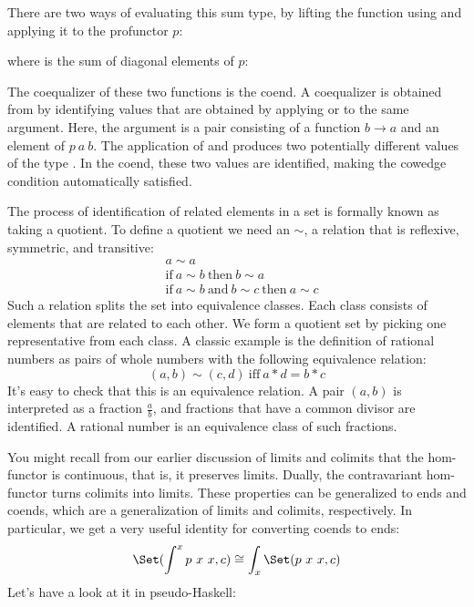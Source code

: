 There are two ways of evaluating this sum type, by lifting the function
using  and applying it to the profunctor $p$:

where  is the sum of diagonal elements of $p$:

The coequalizer of these two functions is the coend. A coequalizer is
obtained from  by identifying values that are
obtained by applying  or  to the same
argument. Here, the argument is a pair consisting of a function
$b \to a$ and an element of $p\ a\ b$. The
application of  and  produces two potentially
different values of the type . In the coend, these
two values are identified, making the cowedge condition automatically
satisfied.

The process of identification of related elements in a set is formally
known as taking a quotient. To define a quotient we need an
 $\sim$, a relation that
is reflexive, symmetric, and transitive:
\begin{align*}
&a \sim a \\
&\text{if}\ a \sim b\ \text{then}\ b \sim a \\
&\text{if}\ a \sim b\ \text{and}\ b \sim c\ \text{then}\ a \sim c
\end{align*}
Such a relation splits the set into equivalence classes. Each class
consists of elements that are related to each other. We form a quotient
set by picking one representative from each class. A classic example is
the definition of rational numbers as pairs of whole numbers with the
following equivalence relation:
\[(a, b) \sim (c, d)\ \text{iff}\ a * d = b * c\]
It's easy to check that this is an equivalence relation. A pair
$(a, b)$ is interpreted as a fraction $\frac{a}{b}$, and
fractions that have a common divisor are identified. A rational number
is an equivalence class of such fractions.

You might recall from our earlier discussion of limits and colimits that
the hom-functor is continuous, that is, it preserves limits. Dually, the
contravariant hom-functor turns colimits into limits. These properties
can be generalized to ends and coends, which are a generalization of
limits and colimits, respectively. In particular, we get a very useful
identity for converting coends to ends:
\[\Set(\int^x p\ x\ x, c) \cong \int_x \Set(p\ x\ x, c)\]
Let's have a look at it in pseudo-Haskell:

